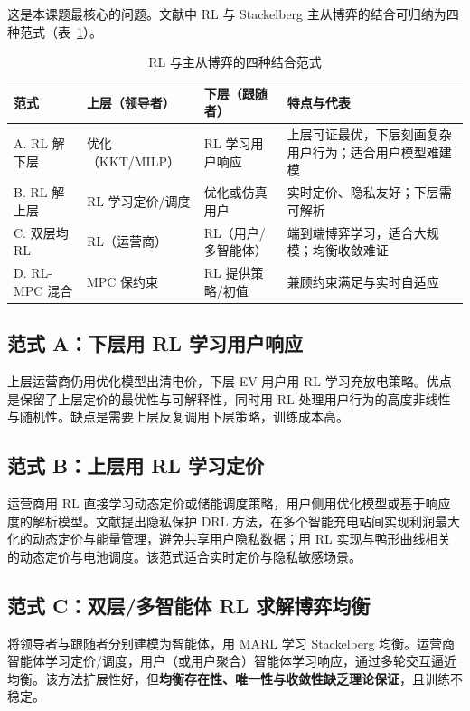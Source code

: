\documentclass[UTF8,a4paper,11pt]{ctexart}
\begin{document}
这是本课题最核心的问题。文献中 RL 与 Stackelberg 主从博弈的结合可归纳为四种范式（表~\ref{tab:combine}）。

\begin{table}[htbp]
\centering
\small
\caption{RL 与主从博弈的四种结合范式}
\label{tab:combine}
\begin{tabular}{p{2.2cm} p{3.2cm} p{3.2cm} p{5.4cm}}
\toprule
\textbf{范式} & \textbf{上层（领导者）} & \textbf{下层（跟随者）} & \textbf{特点与代表}\\
\midrule
A. RL 解下层 & 优化（KKT/MILP） & RL 学习用户响应 & 上层可证最优，下层刻画复杂用户行为；适合用户模型难建模\\
B. RL 解上层 & RL 学习定价/调度 & 优化或仿真用户 & 实时定价、隐私友好；下层需可解析\\
C. 双层均 RL & RL（运营商） & RL（用户/多智能体） & 端到端博弈学习，适合大规模；均衡收敛难证\\
D. RL-MPC 混合 & MPC 保约束 & RL 提供策略/初值 & 兼顾约束满足与实时自适应\cite{ref7}\\
\bottomrule
\end{tabular}
\end{table}

\subsection{范式 A：下层用 RL 学习用户响应}
上层运营商仍用优化模型出清电价，下层 EV 用户用 RL 学习充放电策略。优点是保留了上层定价的最优性与可解释性，同时用 RL 处理用户行为的高度非线性与随机性。缺点是需要上层反复调用下层策略，训练成本高。

\subsection{范式 B：上层用 RL 学习定价}
运营商用 RL 直接学习动态定价或储能调度策略，用户侧用优化模型或基于响应度的解析模型。文献\cite{ref12}提出隐私保护 DRL 方法，在多个智能充电站间实现利润最大化的动态定价与能量管理，避免共享用户隐私数据；\cite{ref15}用 RL 实现与鸭形曲线相关的动态定价与电池调度。该范式适合实时定价与隐私敏感场景。

\subsection{范式 C：双层/多智能体 RL 求解博弈均衡}
将领导者与跟随者分别建模为智能体，用 MARL 学习 Stackelberg 均衡。运营商智能体学习定价/调度，用户（或用户聚合）智能体学习响应，通过多轮交互逼近均衡。该方法扩展性好，但\textbf{均衡存在性、唯一性与收敛性缺乏理论保证}，且训练不稳定。
\end{document}
